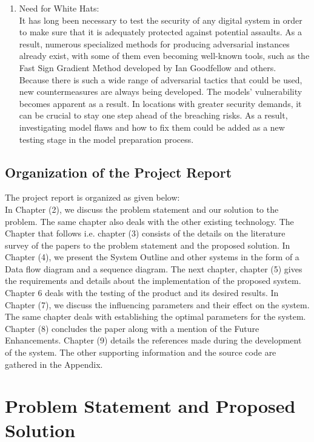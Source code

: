 \documentclass[ 12pt,a4paper,twocolumn,fleqn]{article}
\begin{document}
\begin{enumerate}
    \item Need for White Hats: \\
    It has long been necessary to test the security of any digital system in order to make sure that it is adequately protected against potential assaults. As a result, numerous specialized methods for producing adversarial instances already exist, with some of them even becoming well-known tools, such as the Fast Sign Gradient Method developed by Ian Goodfellow and others.\\
    Because there is such a wide range of adversarial tactics that could be used, new countermeasures are always being developed. The models' vulnerability becomes apparent as a result. In locations with greater security demands, it can be crucial to stay one step ahead of the breaching risks. As a result, investigating model flaws and how to fix them could be added as a new testing stage in the model preparation process.\\
\end{enumerate}
\subsection{Organization of the Project Report}
The project report is organized as given below: \\
%
In Chapter (2), we discuss the problem statement and our solution to the problem. The same chapter also deals with the other existing technology. The Chapter that follows i.e. chapter (3) consists of the details on the literature survey of the papers to the problem statement and the proposed solution. In Chapter (4), we present the System Outline and other systems in the form of a Data flow diagram and a sequence diagram. The next chapter, chapter (5) gives the requirements and details about the implementation of the proposed system. Chapter 6 deals with the testing of the product and its desired results. In Chapter (7), we discuss the influencing parameters and their effect on the system. The same chapter deals with establishing the optimal parameters for the system. Chapter (8) concludes the paper along with a mention of the Future Enhancements. Chapter (9) details the references made during the development of the system. The other supporting information and the source code are gathered in the Appendix. \\
\section{Problem Statement and Proposed Solution}
\end{document}
